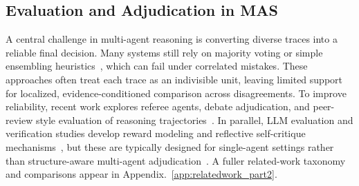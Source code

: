 \documentclass{article}
\theoremstyle{plain}
\theoremstyle{definition}
\theoremstyle{remark}
\begin{document}
\subsection{Evaluation and Adjudication in MAS}
A central challenge in multi-agent reasoning is converting diverse traces into a reliable final decision. 
Many systems still rely on majority voting or simple ensembling heuristics~\cite{chan2023chateval,chen2024llmarena,wei2025lero}, which can fail under correlated mistakes. 
These approaches often treat each trace as an indivisible unit, leaving limited support for localized, evidence-conditioned comparison across disagreements.
To improve reliability, recent work explores referee agents, debate adjudication, and peer-review style evaluation of reasoning trajectories~\cite{abdelnabi2023llm,du2023improving,wang2025mars}. 
In parallel, LLM evaluation and verification studies develop reward modeling and reflective self-critique mechanisms~\cite{kwon2023reward,xie2023self,zhang2024self,yan2024mirror}, but these are typically designed for single-agent settings rather than structure-aware multi-agent adjudication~\cite{lambert2024rewardbench,setlur2024rewarding}. 
A fuller related-work taxonomy and comparisons appear in Appendix.~\ref{app:relatedwork_part2}.


\end{document}
